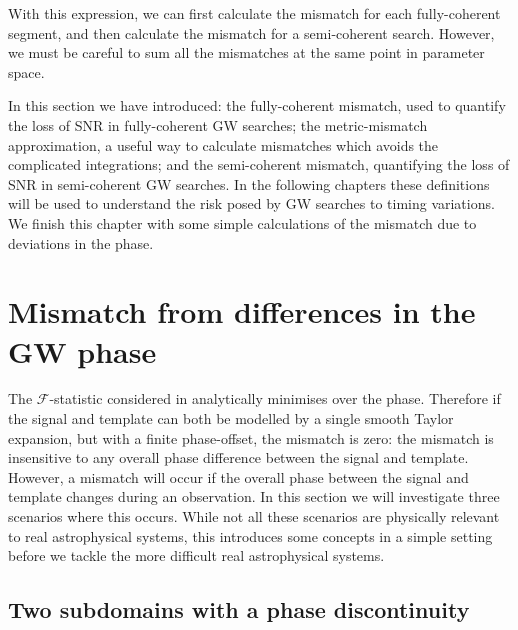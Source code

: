 \documentclass[../full_thesis/full_thesis.tex]{subfiles}
\begin{document}
With this expression, we can first calculate the mismatch for each fully-coherent
segment, and then calculate the mismatch for a semi-coherent search. However, we
must be careful to sum all the mismatches at the same point in parameter space.

In this section we have introduced: the fully-coherent mismatch, used to
quantify the loss of SNR in fully-coherent GW searches; the metric-mismatch
approximation, a useful way to calculate mismatches which avoids the
complicated integrations; and the semi-coherent mismatch, quantifying the loss
of SNR in semi-coherent GW searches. In the following chapters these definitions
will be used to understand the risk posed by GW searches to timing variations.
We finish this chapter with some simple calculations of the mismatch due to
deviations in the phase.


\section{Mismatch from differences in the GW phase}

The $\mathcal{F}$-statistic considered in \citet{Brady1998} analytically
minimises over the phase. Therefore if the signal and template can both be
modelled by a single smooth Taylor expansion, but with a finite phase-offset,
the mismatch is zero: the mismatch is insensitive to any overall phase
difference between the signal and template. However, a mismatch will occur if
the overall phase between the signal and template changes during an
observation. In this section we will investigate three scenarios where this
occurs. While not all these scenarios are physically relevant to real astrophysical
systems, this introduces some concepts in a simple setting before we tackle
the more difficult real astrophysical systems.

\subsection{Two subdomains with a phase discontinuity}
\label{sec: Two segments with a phase offset}
\end{document}
